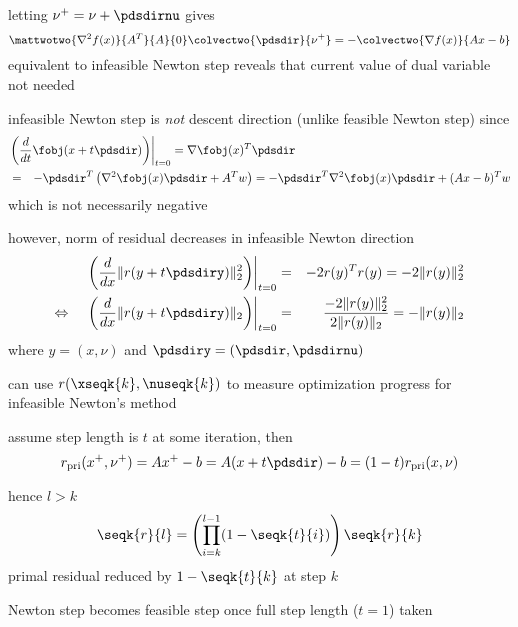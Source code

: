 \documentclass[17pt,landscape]{foils}
\begin{document}
{\vitem
	letting $\nu^+= \nu + \pdsdirnu$ gives
	$$
		\mattwotwo{\nabla^2f(x)}{A^T}{A}{0}
		\colvectwo{\pdsdir}{\nu^+}
		=
		- \colvectwo{\nabla f(x)}{Ax-b}
	$$
	\bit
	\vitem
		equivalent to infeasible Newton step
	\vitem
		reveals that current value of dual variable not needed
	\eit
\eit
\vfill



\bit
\item
	infeasible Newton step is \emph{not} descent direction (unlike feasible Newton step)
	since
	\begin{eqnarray*}
		\lefteqn{
		\left. \left(
			\frac{d}{dt}\fobj(x+t\pdsdir)
		\right) \right|_{t=0}
		=
		\nabla \fobj(x) ^T \pdsdir
		}
	\\
	&=&
		- \pdsdir^T \left(\nabla^2 \fobj(x) \pdsdir + A^Tw \right)
		=
		- \pdsdir^T \nabla^2 \fobj(x) \pdsdir + (Ax-b)^Tw
	\end{eqnarray*}
	which is not necessarily negative

\vitem
	however, norm of residual decreases in infeasible Newton direction
	\begin{eqnarray*}
		\left.
		\left(
			\frac{d}{dx}
			\|r(y+t\pdsdiry)\|_2^2
		\right)
		\right|_{t=0}
		&
		=
		&
		- 2 r(y)^T r(y) = - 2 \|r(y)\|_2^2
		\\
		\Leftrightarrow
		\quad
		\left.
		\left(
			\frac{d}{dx}
			\|r(y+t\pdsdiry)\|_2
		\right)
		\right|_{t=0}
		&
		=
		&
		\frac{-2\|r(y)\|_2^2}{2\|r(y)\|_2}
		= - \|r(y)\|_2
	\end{eqnarray*}
	where $y=(x,\nu)$ and $\pdsdiry = (\pdsdir, \pdsdirnu)$

\vitem
	can use $r(\xseqk{k},\nuseqk{k})$ to measure optimization progress for infeasible Newton's method
\eit
\vfill



\bit
\item
	assume step length is $t$ at some iteration,
	then
	$$
		r_\mathrm{pri}(x^+,\nu^+) = Ax^+-b
		= A(x + t \pdsdir) - b
		= (1-t) r_\mathrm{pri}(x,\nu)
	$$

\vitem
	hence
	$l>k$
	$$
		\seqk{r}{l}
		=
		\left(
		\prod_{i=k}^{l-1}
		(1-\seqk{t}{i})
		\right)
		\seqk{r}{k}
	$$
	\bit
	\vitem
		primal residual reduced by $1-\seqk{t}{k}$ at step $k$

	\vitem
		Newton step becomes feasible step once full step length ($t=1$) taken
	\eit
\eit
\vfill



}
\end{document}
